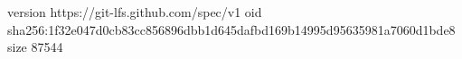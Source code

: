 version https://git-lfs.github.com/spec/v1
oid sha256:1f32e047d0cb83cc856896dbb1d645dafbd169b14995d95635981a7060d1bde8
size 87544
